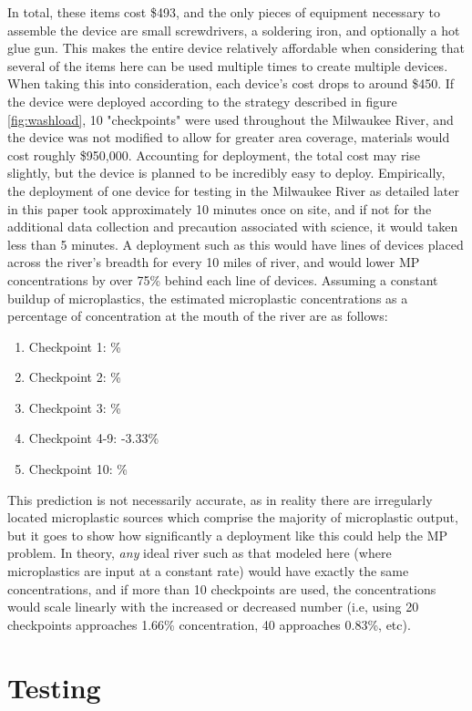 \documentclass[fleqn,10pt]{SelfArx} %
\begin{document}
	In total, these items cost \$493, and the only pieces of equipment necessary to assemble the device are small screwdrivers, a soldering iron, and optionally a hot glue gun. This makes the entire device relatively affordable when considering that several of the items here can be used multiple times to create multiple devices. When taking this into consideration, each device's cost drops to around \$450. If the device were deployed according to the strategy described in figure \ref{fig:washload}, 10 "checkpoints" were used throughout the Milwaukee River, and the device was not modified to allow for greater area coverage, materials would cost roughly \$950,000. Accounting for deployment, the total cost may rise slightly, but the device is planned to be incredibly easy to deploy. Empirically, the deployment of one device for testing in the Milwaukee River as detailed later in this paper took approximately 10 minutes once on site, and if not for the additional data collection and precaution associated with science, it would taken less than 5 minutes. A deployment such as this would have lines of devices placed across the river's breadth for every 10 miles of river, and would lower MP concentrations by over 75\% behind each line of devices. Assuming a constant buildup of microplastics, the estimated microplastic concentrations as a percentage of concentration at the mouth of the river are as follows:
	\begin{enumerate}
		\label{checkpointPredictions}
		\item Checkpoint 1:
			\%
		\item Checkpoint 2:
			\%
		\item Checkpoint 3:
			\%
		\item Checkpoint 4-9:
			-3.33\%
		\item Checkpoint 10:
			\%
	\end{enumerate}
	This prediction is not necessarily accurate, as in reality there are irregularly located microplastic sources which comprise the majority of microplastic output, but it goes to show how significantly a deployment like this could help the MP problem. In theory, \textit{any} ideal river such as that modeled here (where microplastics are input at a constant rate) would have exactly the same concentrations, and if more than 10 checkpoints are used, the concentrations would scale linearly with the increased or decreased number (i.e, using 20 checkpoints approaches 1.66\% concentration, 40 approaches 0.83\%, etc).
	\section{Testing}
\end{document}
